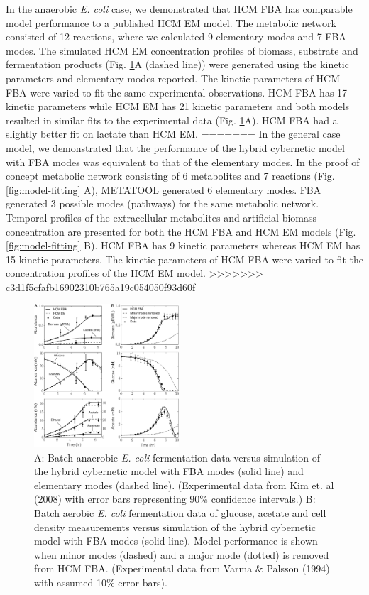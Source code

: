 \documentclass[10pt,twocolumn,twoside,final]{IEEEtran}
\begin{document}
In the anaerobic \textit{E. coli} case, we demonstrated that HCM FBA has comparable model performance to a published HCM EM model\cite{2008_kim_varner_ramkrishna_BiotechProg}.
The metabolic network consisted of 12 reactions, where we calculated 9 elementary modes and 7 FBA modes.
The simulated HCM EM concentration profiles of biomass, substrate and fermentation products (Fig. \ref {fig:ecoli}A (dashed line)) were generated using the kinetic parameters and elementary modes reported\cite{2008_kim_varner_ramkrishna_BiotechProg}. 
The kinetic parameters of HCM FBA were varied to fit the same experimental observations.
HCM FBA has 17 kinetic parameters while HCM EM has 21 kinetic parameters and both models resulted in similar fits to the experimental data (Fig. \ref {fig:ecoli}A).
HCM FBA had a slightly better fit on lactate than HCM EM. 
=======
In the general case model, we demonstrated that the performance of the hybrid cybernetic model with FBA modes was equivalent to that of the elementary modes. In the proof of concept metabolic network consisting of 6 metabolites and 7 reactions (Fig. \ref{fig:model-fitting} A), METATOOL generated 6 elementary modes. FBA generated 3 possible modes (pathways) for the same metabolic network. Temporal profiles of the extracellular metabolites and artificial biomass concentration are presented for both the HCM FBA and HCM EM models (Fig. \ref {fig:model-fitting} B).  HCM FBA has 9 kinetic parameters whereas HCM EM has 15 kinetic parameters. The kinetic parameters of HCM FBA were varied to fit the concentration profiles of the HCM EM model. 
>>>>>>> c3d1f5cfafb16902310b765a19c054050f93d60f

\begin{figure}[!t]\centering
\includegraphics[width=0.48\textwidth]{./figs/Fig-2-Ecoli-SimulationResults.pdf}
\caption{A: Batch anaerobic \textit{E. coli} fermentation data versus simulation of the hybrid cybernetic model with FBA modes (solid line) and elementary modes (dashed line). (Experimental data from Kim et. al (2008)\cite{2008_kim_varner_ramkrishna_BiotechProg} with error bars representing 90\% confidence intervals.) B: Batch aerobic \textit{E. coli} fermentation data of glucose, acetate and cell density measurements versus simulation of the hybrid cybernetic model with FBA modes (solid line). Model performance is shown when minor modes (dashed) and a major mode (dotted) is removed from HCM FBA. (Experimental data from Varma \& Palsson (1994)\cite{1994_varma_palsson_ApplEnvMicro} with assumed 10\% error bars).}
\label{fig:ecoli}
\end{figure} 
\end{document}
